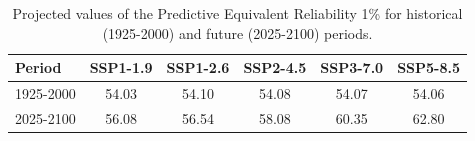 \begin{table}[htbp]
\centering
\begin{tabular}{lccccc}
\toprule
Period & \textbf{SSP1-1.9} & \textbf{SSP1-2.6} & \textbf{SSP2-4.5} & \textbf{SSP3-7.0} & \textbf{SSP5-8.5} \\
\midrule
1925-2000 & 54.03 & 54.10 & 54.08 & 54.07 & 54.06 \\
2025-2100 & 56.08 & 56.54 & 58.08 & 60.35 & 62.80 \\
\bottomrule
\end{tabular}
\caption{Projected values of the Predictive Equivalent Reliability 1\% for historical (1925-2000) and future (2025-2100) periods.}
\label{tab:pred_scenarios_100per}
\end{table}